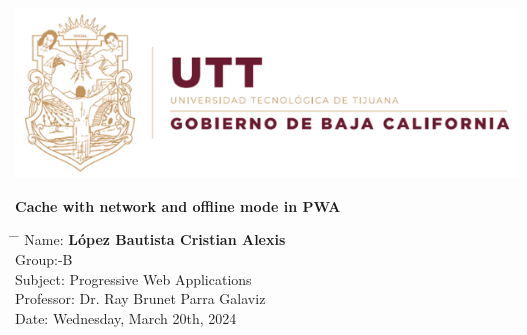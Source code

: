 \documentclass[12pt,a4paper]{article}
\title{}
\author{}
\date{}
\begin{document}
	
	\newcommand{\subf}[2]{%
		{\small\begin{tabular}[t]{@{}c@{}}
				#1\\#2
		\end{tabular}}%
	}
	
	\begin{titlepage}
		\begin{center}
			
			\textbf{}
            \includegraphics[width=1\textwidth]{utt.png}

            \vspace*{3cm}

			\vspace{1.5cm}
			
			\Huge
			\textbf{Cache with network and offline mode in PWA}
			
			\vspace{0.8cm}
			\large
			
			\vspace{0.5cm}
			\LARGE
			
			
			\vfill
			
			
			
			\vspace{0.8cm}
			
			
			
			\Large
			
			
			
			
		\end{center}
		\Large
		\begin{tabbing}
			\hspace*{1em}\= \hspace*{8em} \= \kill %
			\> Name:\>  \textbf{López Bautista Cristian Alexis} \\
			\> Group:\>  10-B \\
			\> Subject:\>  Progressive Web Applications  \\
			\> Professor:  \> Dr. Ray Brunet Parra Galaviz \\
			\> Date: \>  Wednesday, March 20th, 2024
		\end{tabbing}
		
	\end{titlepage}
	
\end{document}
